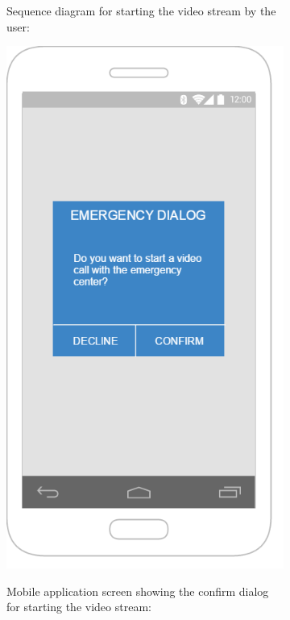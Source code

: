 \documentclass{article}
\begin{document}
\begin{figure}
\begin{subfigure}{.5\textwidth}
  Sequence diagram for starting the video stream by the user:
\end{subfigure}%
\begin{subfigure}{.5\textwidth}
  \centering
  \includegraphics[width=.9\linewidth]{"VideoStream/5"}
	
	Mobile application screen showing the confirm dialog for starting the video stream:
\end{subfigure}
\end{figure}
	\clearpage
	
	
	
\end{document}
